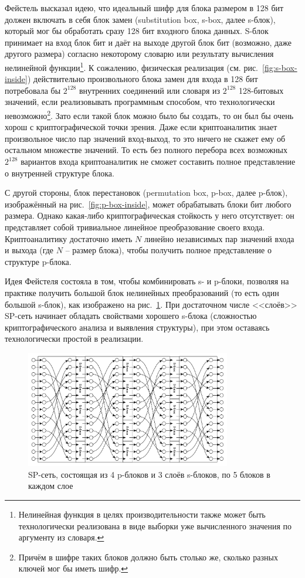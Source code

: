 Фейстель высказал идею, что идеальный шифр для блока размером в 128 бит должен включать в себя блок замен (substitution box, s-box, далее s-блок), который мог бы обработать сразу 128 бит входного блока данных. S-блок принимает на вход блок бит и даёт на выходе другой блок бит (возможно, даже другого размера) согласно некоторому словарю или результату вычисления нелинейной функции\footnote{Нелинейная функция в целях производительности также может быть технологически реализована в виде выборки уже вычисленного значения по аргументу из словаря.}. К сожалению, физическая реализация (см. рис.~\ref{fig:s-box-inside}) действительно произвольного блока замен для входа в 128 бит потребовала бы $2^{128}$ внутренних соединений или словаря из $2^{128}$ 128-битовых значений, если реализовывать программным способом, что технологически невозможно\footnote{Причём в шифре таких блоков должно быть столько же, сколько разных ключей мог бы иметь шифр.}. Зато если такой блок можно было бы создать, то он был бы очень хорош с криптографической точки зрения. Даже если криптоаналитик знает произвольное число пар значений вход-выход, то это ничего не скажет ему об остальном множестве значений. То есть без полного перебора всех возможных $2^{128}$ вариантов входа криптоаналитик не сможет составить полное представление о внутренней структуре блока.

С другой стороны, блок перестановок (permutation box, p-box, далее p-блок), изображённый на рис.~\ref{fig:p-box-inside}, может обрабатывать блоки бит любого размера. Однако какая-либо криптографическая стойкость у него отсутствует: он представляет собой тривиальное линейное преобразование своего входа. Криптоаналитику достаточно иметь $N$ линейно независимых пар значений входа и выхода (где $N$ -- размер блока), чтобы получить полное представление о структуре p-блока.

Идея Фейстеля состояла в том, чтобы комбинировать s- и p-блоки, позволяя на практике получить большой блок нелинейных преобразований (то есть один большой s-блок), как изображено на рис.~\ref{fig:sp-network}. При достаточном числе <<слоёв>> SP-сеть начинает обладать свойствами хорошего s-блока (сложностью криптографического анализа и выявления структуры), при этом оставаясь технологически простой в реализации.

\begin{figure}[htb]
	\centering
	\includegraphics[width=0.8\textwidth]{pic/sp-network}
  \caption{SP-сеть, состоящая из 4 p-блоков и 3 слоёв s-блоков, по 5 блоков в каждом слое}
  \label{fig:sp-network}
\end{figure}

